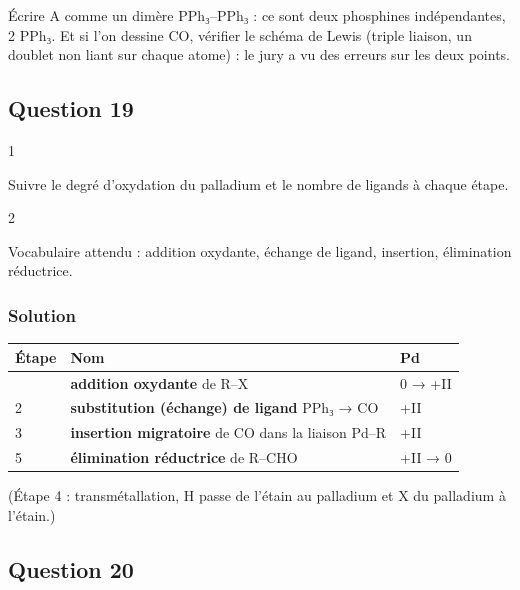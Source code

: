 \documentclass[11pt,a4paper]{article}
\begin{document}
\begin{piege}

Écrire A comme un dimère PPh₃--PPh₃ : ce sont deux phosphines indépendantes, 2 PPh₃. Et si l'on dessine CO, vérifier le schéma de Lewis (triple liaison, un doublet non liant sur chaque atome) : le jury a vu des erreurs sur les deux points.

\end{piege}

\hypertarget{question-19}{%
\subsection{Question 19}\label{question-19}}

\begin{indication}{1}

Suivre le degré d'oxydation du palladium et le nombre de ligands à chaque étape.

\end{indication}

\begin{indication}{2}

Vocabulaire attendu : addition oxydante, échange de ligand, insertion, élimination réductrice.

\end{indication}

\hypertarget{solution-18}{%
\subsubsection{Solution}\label{solution-18}}

\begin{longtable}[]{@{}lll@{}}
\toprule\noalign{}
Étape & Nom & Pd \\
\midrule\noalign{}
\endhead
\bottomrule\noalign{}
\endlastfoot
1 & \textbf{addition oxydante} de R--X & 0 → +II \\
2 & \textbf{substitution (échange) de ligand} PPh₃ → CO & +II \\
3 & \textbf{insertion migratoire} de CO dans la liaison Pd--R & +II \\
5 & \textbf{élimination réductrice} de R--CHO & +II → 0 \\
\end{longtable}

(Étape 4 : transmétallation, H passe de l'étain au palladium et X du palladium à l'étain.)

\hypertarget{question-20}{%
\subsection{Question 20}\label{question-20}}
\end{document}

